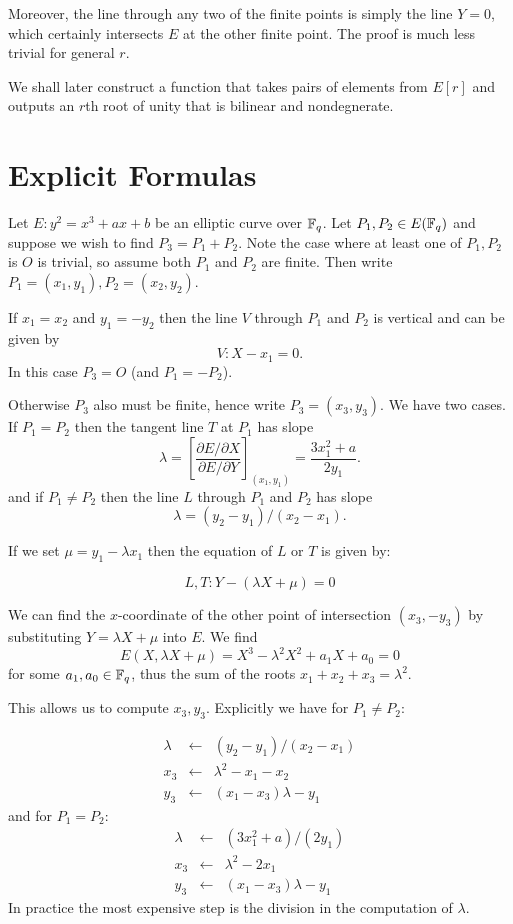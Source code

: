 Moreover,
the line through any two of the finite points is simply the line $Y = 0$,
which certainly intersects $E$ at the other finite point.
The proof is much less trivial for general $r$.

We shall later construct a function
that takes pairs of elements from $E[r]$ and outputs an $r$th root of unity
that is bilinear and nondegnerate.

\section {Explicit Formulas}

Let $E: y^2 = x^3 + ax + b$ be an elliptic curve over $\mathbb{F}_q$. Let
$P_1, P_2 \in E(\mathbb{F}_q)$ and suppose
we wish to find $P_3 = P_1 + P_2$.
Note the case where at least one of $P_1, P_2$ is $O$ is trivial,
so assume both $P_1$ and $P_2$ are finite.
Then write $P_1 = (x_1, y_1), P_2 = (x_2, y_2)$.

If $x_1 = x_2$ and $y_1 = -y_2$
then the line $V$ through $P_1$ and $P_2$ is vertical and
can be given by
\[ V : X - x_1 = 0  . \]
In this case $P_3 = O$ (and $P_1 = -P_2$).

Otherwise $P_3$ also must be finite, hence write $P_3 = (x_3, y_3)$.
We have two cases. If $P_1 = P_2$ then the tangent line $T$ at
$P_1$
has slope
\[\lambda =
\left[ \frac{\partial E / \partial X}{\partial E/ \partial Y} \right]_{(x_1,y_1)}
= \frac{3x_1^2 + a}{2y_1} . \]
and if $P_1 \ne P_2$ then the line $L$ through $P_1$ and $P_2$ has slope
\[ \lambda = (y_2 - y_1)/(x_2 - x_1) . \]

If we set $\mu = y_1 - \lambda x_1$ then
the equation of $L$ or $T$ is given by:

\[ L, T :  Y - (\lambda X + \mu) = 0 \]

We can find the $x$-coordinate of the other point of intersection $(x_3, -y_3)$
by substituting $Y = \lambda X + \mu$ into $E$. We find
\[ E(X, \lambda X+\mu) = X^3 - \lambda^2 X^2 + a_1 X + a_0 = 0 \]
for some $a_1, a_0 \in \mathbb{F}_q$, thus the sum of the roots
$x_1 + x_2 + x_3 = \lambda^2$.

This allows us to compute $x_3, y_3$. Explicitly we have for $P_1 \ne P_2$:

\[
\begin{array}{rcl}
\lambda &\leftarrow& (y_2 - y_1)/(x_2 - x_1) \\
x_3 &\leftarrow& \lambda^2 - x_1 - x_2 \\
y_3 &\leftarrow& (x_1 - x_3) \lambda - y_1
\end{array}
\]
and for $P_1 = P_2$:
\[
\begin{array}{rcl}
\lambda &\leftarrow& (3x_1^2 + a)/(2y_1) \\
x_3 &\leftarrow& \lambda^2 - 2x_1 \\
y_3 &\leftarrow& (x_1 - x_3) \lambda - y_1
\end{array}
\]
In practice the most expensive step is the division in the computation of
$\lambda$.

